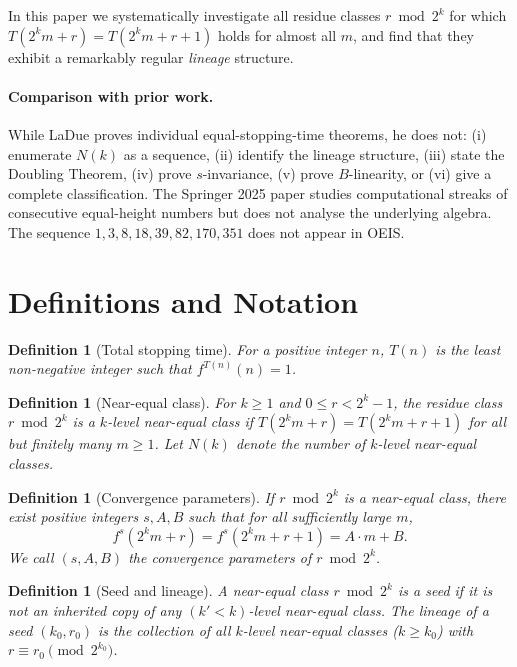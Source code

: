 \documentclass[twocolumn,a4paper,10pt]{article}
\newtheorem{definition}[theorem]{Definition}
\begin{document}
In this paper we systematically investigate all residue classes $r \bmod 2^k$
for which $T(2^k m + r) = T(2^k m + r + 1)$ holds for almost all $m$,
and find that they exhibit a remarkably regular \emph{lineage} structure.

\paragraph{Comparison with prior work.}
While LaDue \cite{ladue2017} proves individual equal-stopping-time theorems,
he does not:
(i) enumerate $N(k)$ as a sequence,
(ii) identify the lineage structure,
(iii) state the Doubling Theorem,
(iv) prove $s$-invariance,
(v) prove $B$-linearity, or
(vi) give a complete classification.
The Springer 2025 paper \cite{springer2025} studies computational streaks of
consecutive equal-height numbers but does not analyse the underlying algebra.
The sequence $1, 3, 8, 18, 39, 82, 170, 351$ does not appear in OEIS.

\section{Definitions and Notation}

\begin{definition}[Total stopping time]
For a positive integer $n$, $T(n)$ is the least non-negative integer
such that $f^{T(n)}(n) = 1$.
\end{definition}

\begin{definition}[Near-equal class]
For $k \geq 1$ and $0 \leq r < 2^k - 1$,
the residue class $r \bmod 2^k$ is a \emph{$k$-level near-equal class}
if $T(2^k m + r) = T(2^k m + r + 1)$ for all but finitely many $m \geq 1$.
Let $N(k)$ denote the number of $k$-level near-equal classes.
\end{definition}

\begin{definition}[Convergence parameters]
If $r \bmod 2^k$ is a near-equal class, there exist positive integers
$s, A, B$ such that for all sufficiently large $m$,
\[
  f^s(2^k m + r) = f^s(2^k m + r + 1) = A \cdot m + B.
\]
We call $(s, A, B)$ the \emph{convergence parameters} of $r \bmod 2^k$.
\end{definition}

\begin{definition}[Seed and lineage]
A near-equal class $r \bmod 2^k$ is a \emph{seed} if it is not an
inherited copy of any $(k'\! < k)$-level near-equal class.
The \emph{lineage} of a seed $(k_0, r_0)$ is the collection of all
$k$-level near-equal classes ($k \geq k_0$) with $r \equiv r_0 \pmod{2^{k_0}}$.
\end{definition}
\end{document}
